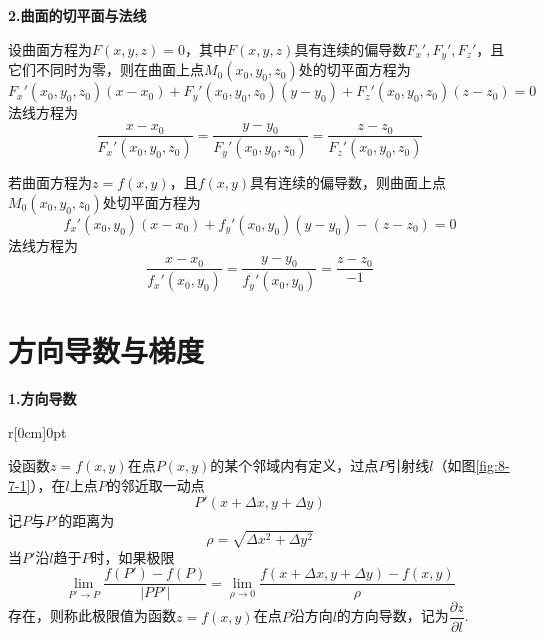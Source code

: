 \textbf{2.曲面的切平面与法线}

设曲面方程为$F(x,y,z)=0$，其中$F(x,y,z)$具有连续的偏导数$F_x',F_y',F_z'$，且它们不同时为零，则在曲面上点$M_0(x_0,y_0,z_0)$处的切平面方程为
\begin{equation*}
    F_x'(x_0,y_0,z_0)(x-x_0)+F_y'(x_0,y_0,z_0)(y-y_0)+F_z'(x_0,y_0,z_0)(z-z_0)=0
\end{equation*}
法线方程为
\begin{equation*}
    \dfrac{x-x_0}{F_x'(x_0,y_0,z_0)}=\dfrac{y-y_0}{F_y'(x_0,y_0,z_0)}=\dfrac{z-z_0}{F_z'(x_0,y_0,z_0)}
\end{equation*}

若曲面方程为$z=f(x,y)$，且$f(x,y)$具有连续的偏导数，则曲面上点$M_0(x_0,y_0,z_0)$处切平面方程为
\begin{equation*}
    f_x'(x_0,y_0)(x-x_0)+f_y'(x_0,y_0)(y-y_0)-(z-z_0)=0
\end{equation*}
法线方程为
\begin{equation*}
    \dfrac{x-x_0}{f_x'(x_0,y_0)}=\dfrac{y-y_0}{f_y'(x_0,y_0)}=\dfrac{z-z_0}{-1}
\end{equation*}

\section{方向导数与梯度}
\textbf{1.方向导数}

\begin{wrapfigure}{r}[0cm]{0pt}   
    \caption{} \label{fig:8-7-1}
\end{wrapfigure}
设函数$z=f(x,y)$在点$P(x,y)$的某个邻域内有定义，过点$P$引射线$l$（如图\ref{fig:8-7-1}），在$l$上点$P$的邻近取一动点
\begin{equation*}
    P'(x+\Delta x, y+\Delta y)
\end{equation*}
记$P$与$P'$的距离为
\begin{equation*}
    \rho=\sqrt{\Delta x^2+\Delta y^2}
\end{equation*}
当$P'$沿$l$趋于$P$时，如果极限
\begin{equation*}
    \lim_{P'\rightarrow P}\dfrac{f(P')-f(P)}{|PP'|}=\lim_{\rho\rightarrow 0}\dfrac{f(x+\Delta x,y+\Delta y)-f(x,y)}{\rho}
\end{equation*}
存在，则称此极限值为函数$z=f(x,y)$在点$P$沿方向$l$的方向导数，记为$\dfrac{\partial z}{\partial l}$.


